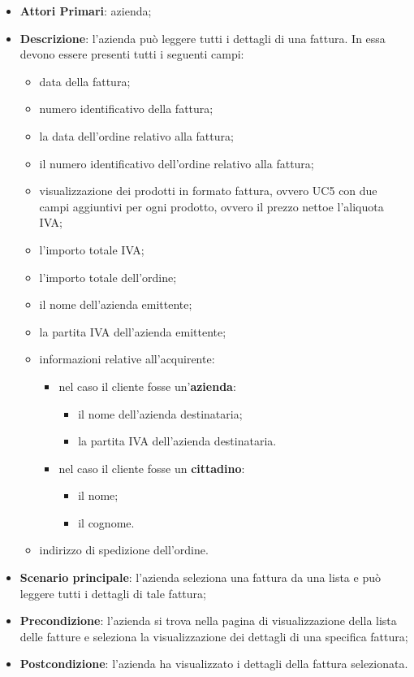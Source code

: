 \begin{itemize}
	\item \textbf{Attori Primari}: azienda;
	\item \textbf{Descrizione}: l'azienda può leggere tutti i dettagli di una fattura. In essa devono essere presenti tutti i seguenti campi:
	\begin{itemize}
		\item data della fattura;
		\item numero identificativo della fattura;
		\item la data dell'ordine relativo alla fattura;
		\item il numero identificativo dell'ordine relativo alla fattura;
		\item visualizzazione dei prodotti in formato fattura, ovvero UC5 con due campi aggiuntivi per ogni prodotto, ovvero il prezzo netto\glosp e l'aliquota IVA;
		\item l'importo totale IVA;
		\item l'importo totale dell'ordine;
		\item il nome dell'azienda emittente;
		\item la partita IVA dell'azienda emittente;
		\item informazioni relative all'acquirente:
		\begin{itemize}
			\item nel caso il cliente fosse un'\textbf{azienda}:
			\begin{itemize}
				\item il nome dell'azienda destinataria;
				\item la partita IVA dell'azienda destinataria.
			\end{itemize}
			\item nel caso il cliente fosse un \textbf{cittadino}:
			\begin{itemize}
				\item il nome;
				\item il cognome.
			\end{itemize}
		\end{itemize}
		
		\item indirizzo di spedizione dell'ordine.
	\end{itemize}
	\item \textbf{Scenario principale}: l'azienda seleziona una fattura da una lista e può leggere tutti i dettagli di tale fattura;
	\item \textbf{Precondizione}: l'azienda si trova nella pagina di visualizzazione della lista delle fatture e seleziona la visualizzazione dei dettagli di una specifica fattura;
	\item \textbf{Postcondizione}: l'azienda ha visualizzato i dettagli della fattura selezionata.
\end{itemize} 

